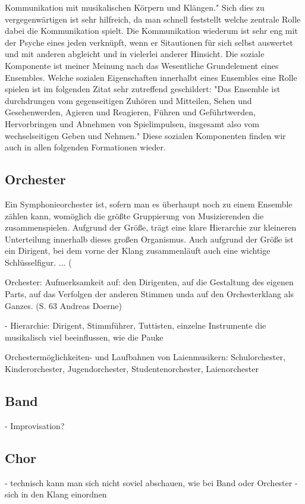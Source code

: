 Kommunikation mit musikalischen Körpern und Klängen."
\autocite[62]{doerne:umfassend_musizieren} Sich dies zu vergegenwärtigen ist
sehr hilfreich, da man schnell feststellt welche zentrale Rolle dabei die
Kommunikation spielt. Die Kommunikation wiederum ist sehr eng mit der Psyche
eines jeden verknüpft, wenn er Sitautionen für sich selbst auswertet und mit
anderen abgleicht und in vielerlei anderer Hinsicht. Die soziale Komponente ist
meiner Meinung nach das Wesentliche Grundelement eines Ensembles. Welche
sozialen Eigenschaften innerhalbt eines Ensembles eine Rolle spielen ist im
folgenden Zitat sehr zutreffend geschildert: "Das Ensemble ist durchdrungen vom
gegenseitigen Zuhören und Mitteilen, Sehen und Gesehenwerden, Agieren und
Reagieren, Führen und Geführtwerden, Hervorbringen und Abnehmen von
Spielimpulsen, insgesamt also vom wechselseitigen Geben und Nehmen."
\autocite[62]{doerne:umfassend_musizieren} Diese sozialen Komponenten finden wir
auch in allen folgenden Formationen wieder. 


\subsection{Orchester} 

Ein Symphonieorchester ist, sofern man es überhaupt noch zu einem Ensemble
zählen kann, womöglich die größte Gruppierung von Musizierenden die
zusammenspielen. Aufgrund der Größe, trägt eine klare Hierarchie zur kleineren
Unterteilung innerhalb dieses großen Organismus. Auch aufgrund der Größe ist ein
Dirigent, bei dem vorne der Klang zusammenläuft auch eine wichtige
Schlüsselfigur. ... (%

Orchester: Aufmerksamkeit auf: den Dirigenten, auf die Gestaltung des eigenen
Parts, auf das Verfolgen der anderen Stimmen unda auf den Orchesterklang als
Ganzes. (S. 63 Andreas Doerne)

- Hierarchie: Dirigent, Stimmführer, Tuttisten, einzelne Instrumente die
musikalisch viel beeinflussen, wie die Pauke

Orchestermöglichkeiten- und Laufbahnen von Laienmusikern: Schulorchester,
Kinderorchester, Jugendorchester, Studentenorchester, Laienorchester


\subsection{Band}
- Improvisation?


\subsection{Chor}
- technisch kann man sich nicht soviel abschauen, wie bei Band oder Orchester -
sich in den Klang einordnen


